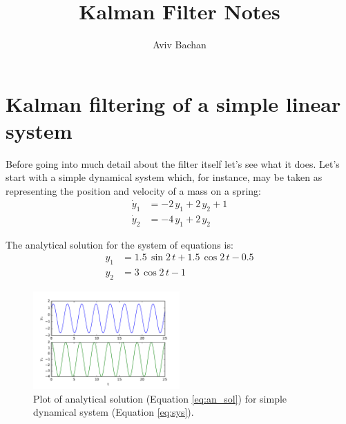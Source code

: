 \documentclass[12pt,oneside]{amsart}
\title{Kalman Filter Notes}
\author{Aviv Bachan}
\begin{document}
\maketitle


\section{Kalman filtering of a simple linear system}
Before going into much detail about the filter itself let's see what it does. Let's start with a simple dynamical system which, for instance, may be taken as representing the position and velocity of a mass on a spring:
\begin{equation}\label{eq:sys}
\begin{aligned}
\dot y_1 &= -2\,y_1 + 2\,y_2 + 1\\
\dot y_2 &= -4\,y_1 + 2\,y_2
\end{aligned}
\end{equation}





The analytical solution for the system of equations is:
\begin{equation}\label{eq:an_sol}
\begin{aligned}
y_1 &= 1.5\,\sin{2\,t} + 1.5\,\cos{2\,t} - 0.5
\\
y_2 &= 3\,\cos{2\,t} - 1
\end{aligned}
\end{equation}

\begin{figure}[htbp]
\begin{center}
\includegraphics[width = 0.5\textwidth]{Figures/analytical_solution}
\caption{Plot of analytical solution (Equation \ref{eq:an_sol}) for simple dynamical system (Equation \ref{eq:sys}).}
\label{fig:an_sol}
\end{center}
\end{figure}
\end{document}
